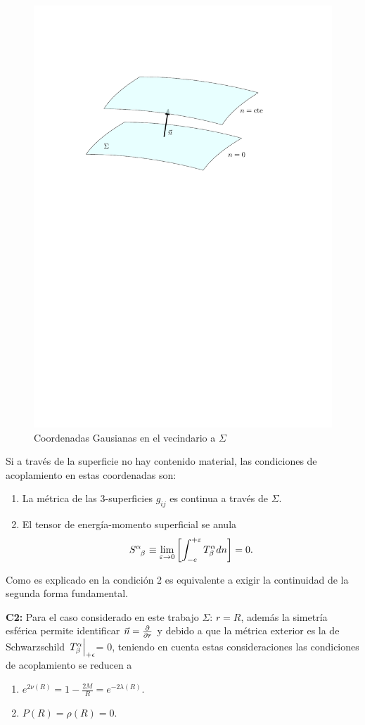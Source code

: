  \begin{figure}[H]
     \centering
     \includegraphics[width=0.7\linewidth]{figures/Junction.pdf}
     \caption{Coordenadas Gausianas en el vecindario a $\Sigma$}
     \label{JC}
 \end{figure}
Si a través de la superficie no hay contenido material, las condiciones de acoplamiento en estas coordenadas son:
 \begin{enumerate}[leftmargin=2cm]
     \item La métrica de las 3-superficies $g_{ij}$ es continua a través de $\Sigma$.
     \item El tensor de energía-momento superficial se anula
     \begin{equation}
\tensor{S}{^\alpha_\beta}\equiv\lim _{\varepsilon \rightarrow 0}\left[\int_{-e}^{+\varepsilon} T_{\beta}^{\alpha} d n\right]=0.
    \end{equation}
 \end{enumerate}

 Como es explicado en \cite{Misner1973} la condición 2 es equivalente a exigir la continuidad de la segunda forma fundamental. 
 
 \textbf{C2:} Para el caso considerado en este trabajo $\Sigma:\,r=R$, además la simetría esférica permite identificar $\vec{n}=\pdv{r}$ y debido a que la métrica exterior es la de Schwarzschild $\eval{T^{\alpha}_{\beta}}_{+\epsilon}$= 0, teniendo en cuenta estas consideraciones las condiciones de acoplamiento se reducen a
 \begin{enumerate}[leftmargin=2cm]
     \item $e ^ {  2 \nu(R) } =  1 - \frac { 2 M } { R }= e ^ { -2 \lambda(R) }$.
    \item $P(R)=\rho(R)=0$.
 \end{enumerate}


